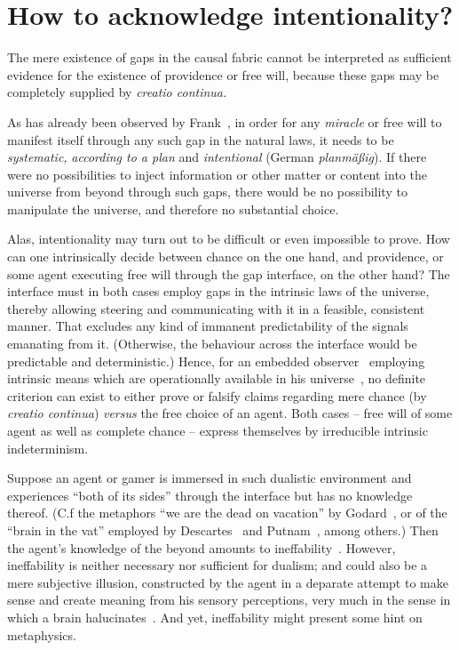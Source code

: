 \section{How to acknowledge intentionality?}
\label{2016-pu-book-chapter-di-section-intent}

The mere existence of gaps in the causal fabric cannot be interpreted as sufficient evidence
for the existence of providence or free will,
because these gaps may be completely supplied by {\em creatio continua.}


As has already been observed by Frank~\cite[Kapitel~{III}, Sects.~14,~15]{frank},
in order for any {\em miracle} or free will to manifest itself
through any such gap in the natural laws, it needs to be {\em systematic,}
{\em according to a plan}
and
{\em intentional} (German {\it planm\"a\ss ig}).
If there were no possibilities to inject information or other matter or content
into the universe from beyond through such gaps, there would be no possibility to manipulate the universe,
and therefore no substantial choice.


Alas, intentionality may turn out to be difficult or even impossible to prove.
How can one intrinsically decide between chance on the one hand, and providence, or some agent executing free will through the gap interface, on the other hand?
The interface must in both cases employ gaps in the intrinsic laws of the universe,
thereby allowing steering and communicating with it in a feasible, consistent manner.
That excludes any kind of immanent predictability of the signals emanating from it.
(Otherwise, the behaviour across the interface would be predictable and deterministic.)
Hence, for an embedded observer~\cite{toffoli:79} employing intrinsic  means
which are operationally available in his universe~\cite{svozil-94},
no definite criterion can exist to either prove or falsify claims regarding mere
chance (by {\it creatio continua}) {\it versus} the free choice of an agent.
Both cases
--
free will of some agent as well as complete chance
--
express themselves by irreducible intrinsic indeterminism.

Suppose an agent or gamer is immersed in such dualistic environment and experiences ``both of its sides'' through the interface
but has no knowledge thereof.
(C.f the metaphors  ``we are the dead on vacation'' by Godard~\cite{godard-aa},
or of the ``brain in the vat'' employed by Descartes~\cite[Second meditation, 26-29]{descartes-meditation}
and Putnam~\cite[Chapter~1]{putnam:81}, among others.)
Then the agent's knowledge of the beyond amounts to ineffability~\cite{Jonas-ineffability}.
However, ineffability is neither necessary nor sufficient for dualism; and could  also be a mere subjective illusion,
constructed by the agent in a deparate attempt to make sense and create meaning from his sensory perceptions,
very much in the sense in which a brain halucinates~\cite{Powers596}.
And yet, ineffability might present some hint on metaphysics.


